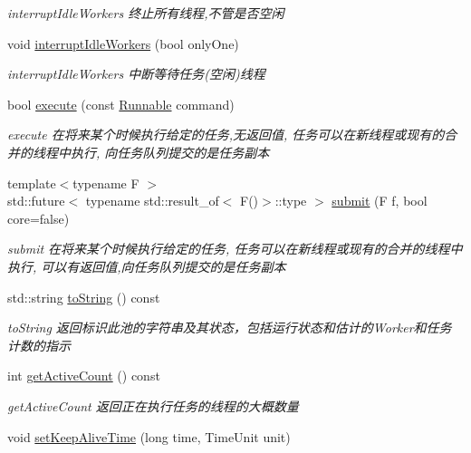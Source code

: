 \begin{DoxyCompactItemize}
\begin{DoxyCompactList}\small\item\em interrupt\+Idle\+Workers 终止所有线程,不管是否空闲 \end{DoxyCompactList}\item 
void \hyperlink{classThreadPoolExecutor_a7e73a64e24e93e9dc25cf2baeda4a0cb}{interrupt\+Idle\+Workers} (bool only\+One)
\begin{DoxyCompactList}\small\item\em interrupt\+Idle\+Workers 中断等待任务(空闲)线程 \end{DoxyCompactList}\item 
bool \hyperlink{classThreadPoolExecutor_a04e334b5d7f3b383aa01fbac80120feb}{execute} (const \hyperlink{classRunnable}{Runnable} command)
\begin{DoxyCompactList}\small\item\em execute 在将来某个时候执行给定的任务,无返回值, 任务可以在新线程或现有的合并的线程中执行, 向任务队列提交的是任务副本 \end{DoxyCompactList}\item 
{\footnotesize template$<$typename F $>$ }\\std\+::future$<$ typename std\+::result\+\_\+of$<$ F()$>$\+::type $>$ \hyperlink{classThreadPoolExecutor_aaaef92fe45f7f5a8b659187c15881ca3}{submit} (F f, bool core=false)
\begin{DoxyCompactList}\small\item\em submit 在将来某个时候执行给定的任务, 任务可以在新线程或现有的合并的线程中执行, 可以有返回值,向任务队列提交的是任务副本 \end{DoxyCompactList}\item 
std\+::string \hyperlink{classThreadPoolExecutor_af85a124c9169a546bfbd725725024527}{to\+String} () const
\begin{DoxyCompactList}\small\item\em to\+String 返回标识此池的字符串及其状态，包括运行状态和估计的\+Worker和任务计数的指示 \end{DoxyCompactList}\item 
int \hyperlink{classThreadPoolExecutor_a1a4a5262dc8db7933c27dbbc267d4825}{get\+Active\+Count} () const
\begin{DoxyCompactList}\small\item\em get\+Active\+Count 返回正在执行任务的线程的大概数量 \end{DoxyCompactList}\item 
void \hyperlink{classThreadPoolExecutor_a08c40e5f4ae67709ae163e3a72eb4054}{set\+Keep\+Alive\+Time} (long time, Time\+Unit unit)

\end{DoxyCompactItemize}
